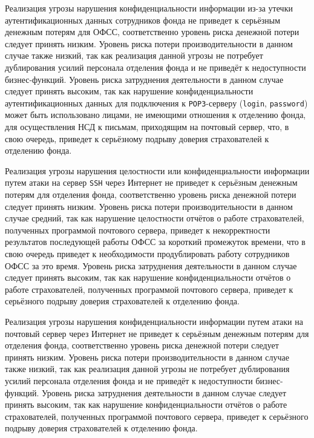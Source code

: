 \point Реализация угрозы нарушения конфиденциальности информации из-за
утечки аутентификационных данных сотрудников фонда не приведет к
серьёзным денежным потерям для ОФСС, соответственно уровень риска
денежной потери следует принять низким. Уровень риска потери
производительности в данном случае также низкий, так как реализация
данной угрозы не потребует дублирования усилий персонала отделения
фонда и не приведёт к недоступности бизнес-функций. Уровень риска
затруднения деятельности в данном случае следует принять высоким, так
как нарушение конфиденциальности аутентификационных данных для
подключения к \texttt{POP3}-серверу (\texttt{login},
\texttt{password}) может быть использовано лицами, не имеющими
отношения к отделению фонда, для осуществления НСД к письмам,
приходящим на почтовый сервер, что, в свою очередь, приведет к
серьёзному подрыву доверия страхователей к отделению фонда.

\point Реализация угрозы нарушения целостности или конфиденциальности
информации путем атаки на сервер \texttt{SSH} через Интернет не
приведет к серьёзным денежным потерям для отделения фонда,
соответственно уровень риска денежной потери следует принять
низким. Уровень риска потери производительности в данном случае
средний, так как нарушение целостности отчётов о работе страхователей,
полученных программой почтового сервера, приведет к некорректности
результатов последующей работы ОФСС за короткий промежуток времени,
что в свою очередь приведет к необходимости продублировать работу
сотрудников ОФСС за это время. Уровень риска затруднения деятельности
в данном случае следует принять высоким, так как нарушение
конфиденциальности отчётов о работе страхователей, полученных
программой почтового сервера, приведет к серьёзного подрыву доверия
страхователей к отделению фонда.

\point Реализация угрозы нарушения конфиденциальности информации путем
атаки на почтовый сервер через Интернет не приведет к серьёзным
денежным потерям для отделения фонда, соответственно уровень риска
денежной потери следует принять низким. Уровень риска потери
производительности в данном случае также низкий, так как реализация
данной угрозы не потребует дублирования усилий персонала отделения
фонда и не приведёт к недоступности бизнес-функций. Уровень риска
затруднения деятельности в данном случае следует принять высоким, так
как нарушение конфиденциальности отчётов о работе страхователей,
полученных программой почтового сервера, приведет к серьёзного подрыву
доверия страхователей к отделению фонда.

